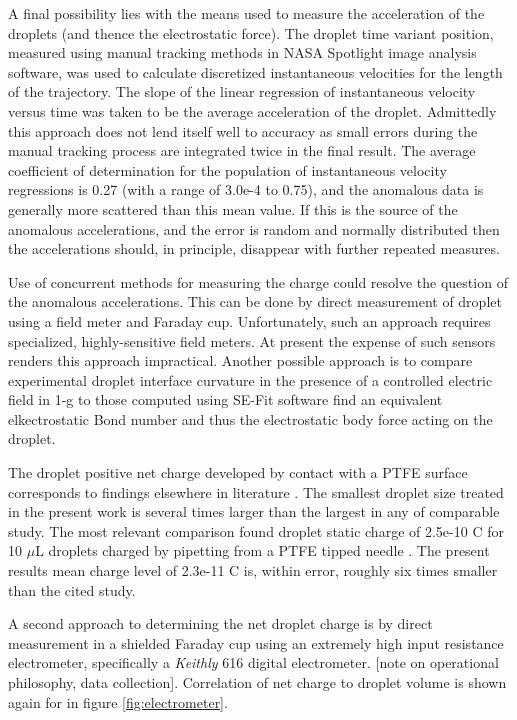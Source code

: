 \documentclass{jfm}
\begin{document}
A final possibility lies with the means used to measure the acceleration of the droplets (and thence the electrostatic force). The droplet time variant position, measured using manual tracking methods in NASA Spotlight image analysis software, was used to calculate discretized instantaneous velocities for the length of the trajectory. The slope of the linear regression of instantaneous velocity versus time was taken to be the average acceleration of the droplet. Admittedly this approach does not lend itself well to accuracy as small errors during the manual tracking process are integrated twice in the final result. The average coefficient of determination for the population of instantaneous velocity regressions is 0.27 (with a range of 3.0e-4 to 0.75), and the anomalous data is generally more scattered than this mean value. If this is the source of the anomalous accelerations, and the error is random and normally distributed then the accelerations should, in principle, disappear with further repeated measures. 

Use of concurrent methods for measuring the charge could resolve the question of the anomalous accelerations. This can be done by direct measurement of droplet using a field meter and Faraday cup. Unfortunately, such an approach requires specialized, highly-sensitive field meters. At present the expense of such sensors renders this approach impractical. Another possible approach is to compare experimental droplet interface curvature in the presence of a controlled electric field in 1-g to those computed using SE-Fit software find an equivalent elkectrostatic Bond number and thus the electrostatic body force acting on the droplet.

The droplet positive net charge developed by contact with a PTFE surface corresponds to findings elsewhere in literature \cite{Choi:2013dg} \cite{Miljkovic:2013dg} \cite{Moreno-Villa:1998dg}. The smallest droplet size treated in the present work is several times larger than the largest in any of comparable study. The most relevant comparison found droplet static charge of 2.5e-10 C for 10 $\mu$L droplets charged by pipetting from a PTFE tipped needle \cite{Choi:2013dg}. The present results mean charge level of 2.3e-11 C is, within error, roughly six times smaller than the cited study. 

A second approach to determining the net droplet charge is by direct measurement in a shielded Faraday cup using an extremely high input resistance electrometer, specifically a \emph{Keithly} 616 digital electrometer. [note on operational philosophy, data collection]. Correlation of net charge to droplet volume is shown again for in figure \ref{fig:electrometer}.
\end{document}
